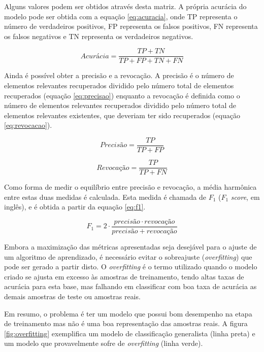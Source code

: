 Alguns valores podem ser obtidos através desta matriz. A própria acurácia do modelo pode ser obtida com a equação \ref{eq:acuracia}, onde TP representa o número de verdadeiros positivos, FP representa os falsos positivos, FN representa os falsos negativos e TN representa os verdadeiros negativos.

\begin{equation}
  \displaystyle Acurácia = \frac{TP+TN}{TP+FP+TN+FN}
\label{eq:acuracia}
\end{equation}

Ainda é possível obter a precisão e a revocação. A precisão é o número de elementos relevantes recuperados dividido pelo número total de elementos recuperados (equação \ref{eq:precisao}) enquanto a revocação é definida como o número de elementos relevantes recuperados dividido pelo número total de elementos relevantes existentes, que deveriam ter sido recuperados (equação \ref{eq:revocacao}).

\begin{equation}
  \displaystyle Precisão = \frac{TP}{TP+FP}
\label{eq:precisao}
\end{equation}

\begin{equation}
  \displaystyle Revocação = \frac{TP}{TP+FN}
\label{eq:revocacao}
\end{equation}

Como forma de medir o equilíbrio entre precisão e revocação, a média harmônica entre estas duas medidas é calculada. Esta medida é chamada de $F_1$ ($F_1$ \textit{score}, em inglês), e é obtida a partir da equação \ref{eq:f1}.

\begin{equation}
  \displaystyle F_1 = 2 \cdot \frac{precisão \cdot revocação}{precisão + revocação}
\label{eq:f1}
\end{equation}

Embora a maximização das métricas apresentadas seja desejável para o ajuste de um algoritmo de aprendizado, é necessário evitar o sobreajuste (\textit{overfitting}) que pode ser gerado a partir disto. O \textit{overfitting} é o termo utilizado quando o modelo criado se ajusta em excesso às amostras de treinamento, tendo altas taxas de acurácia para esta base, mas falhando em classificar com boa taxa de acurácia as demais amostras de teste ou amostras reais.

Em resumo, o problema é ter um modelo que possui bom desempenho na etapa de treinamento mas não é uma boa representação das amostras reais. A figura \ref{fig:overfitting} exemplifica um modelo de classificação generalista (linha preta) e um modelo que provavelmente sofre de \textit{overfitting} (linha verde).


